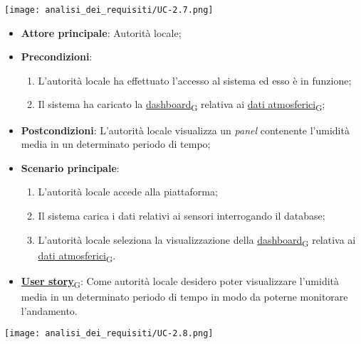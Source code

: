 \begin{center}
	\texttt{[image: analisi\_dei\_requisiti/UC-2.7.png]}
\end{center}

\begin{itemize}
	\item \textbf{Attore principale}: Autorità locale;
	\item \textbf{Precondizioni}:
	      \begin{enumerate}
		      \item L'autorità locale ha effettuato l'accesso al sistema ed esso è in funzione;
		      \item Il sistema ha caricato la \href{https://7last.github.io/docs/rtb/documentazione-interna/glossario\#dashboard}{dashboard\textsubscript{G}} relativa ai \href{https://7last.github.io/docs/rtb/documentazione-interna/glossario\#dati-atmosferici}{dati atmosferici\textsubscript{G}};
	      \end{enumerate}
	\item \textbf{Postcondizioni}: L'autorità locale visualizza un \textit{panel} contenente l'umidità media in un determinato periodo di tempo;
	\item \textbf{Scenario principale}:
	      \begin{enumerate}
		      \item L'autorità locale accede alla piattaforma;
		      \item Il sistema carica i dati relativi ai sensori interrogando il database;
		      \item L'autorità locale seleziona la visualizzazione della \href{https://7last.github.io/docs/rtb/documentazione-interna/glossario\#dashboard}{dashboard\textsubscript{G}} relativa ai \href{https://7last.github.io/docs/rtb/documentazione-interna/glossario\#dati-atmosferici}{dati atmosferici\textsubscript{G}}.
	      \end{enumerate}
	\item \href{https://7last.github.io/docs/rtb/documentazione-interna/glossario\#user-story}{\textbf{User story}\textsubscript{G}}: Come autorità locale desidero poter visualizzare l'umidità media in un determinato periodo di tempo
	      in modo da poterne monitorare l'andamento.
\end{itemize}

\begin{center}
	\texttt{[image: analisi\_dei\_requisiti/UC-2.8.png]}
\end{center}

